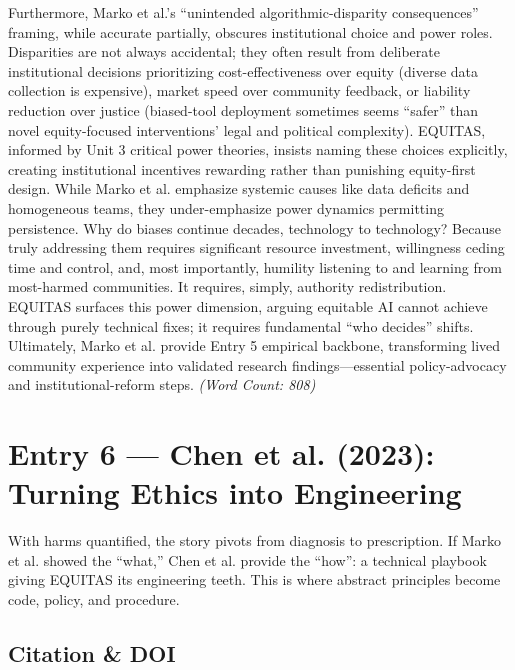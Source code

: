 \documentclass[11pt,twoside]{article}
\begin{document}
Furthermore, Marko et al.'s ``unintended algorithmic-disparity consequences'' framing, while accurate partially, obscures institutional choice and power roles. Disparities are not always accidental; they often result from deliberate institutional decisions prioritizing cost-effectiveness over equity (diverse data collection is expensive), market speed over community feedback, or liability reduction over justice (biased-tool deployment sometimes seems ``safer'' than novel equity-focused interventions' legal and political complexity). EQUITAS, informed by Unit 3 critical power theories, insists naming these choices explicitly, creating institutional incentives rewarding rather than punishing equity-first design. While Marko et al. emphasize systemic causes like data deficits and homogeneous teams, they under-emphasize power dynamics permitting persistence. Why do biases continue decades, technology to technology? Because truly addressing them requires significant resource investment, willingness ceding time and control, and, most importantly, humility listening to and learning from most-harmed communities. It requires, simply, authority redistribution. EQUITAS surfaces this power dimension, arguing equitable AI cannot achieve through purely technical fixes; it requires fundamental ``who decides'' shifts. Ultimately, Marko et al. provide Entry 5 empirical backbone, transforming lived community experience into validated research findings---essential policy-advocacy and institutional-reform steps. \textit{(Word Count: 808)}

\newpage


\label{entry6}
\section*{Entry 6 --- Chen et al. (2023): Turning Ethics into Engineering}

\vspace{-0.3cm}

With harms quantified, the story pivots from diagnosis to prescription. If Marko et al. showed the ``what,'' Chen et al. provide the ``how'': a technical playbook giving \textsc{EQUITAS} its engineering teeth. This is where abstract principles become code, policy, and procedure.

\vspace{-0.3cm}

\subsection*{Citation \& DOI}
\end{document}
